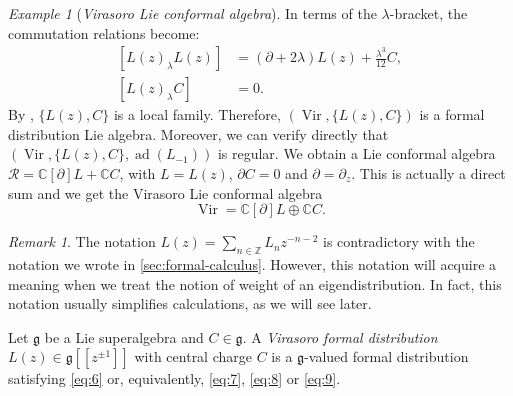 \documentclass[a4paper, 12pt, reqno]{amsart}
\theoremstyle{remark}
\newtheorem{remark}[theorem]{Remark}
\newtheorem{example}[theorem]{Example}
\numberwithin{equation}{subsection}
\DeclareMathOperator{\Vir}{Vir}
\DeclareMathOperator{\ad}{ad}
\begin{document}
\begin{example}[\emph{Virasoro Lie conformal algebra}]
  In terms of the $\lambda$-bracket, the commutation relations become:
  \begin{equation}
    \label{eq:9}
    \begin{split}
      [L(z)_{\lambda}L(z)] &= (\partial + 2\lambda)L(z) + \frac{\lambda^3}{12}C, \\
      [L(z)_{\lambda}C] &= 0.
    \end{split}
\end{equation}
  By , $\{L(z), C\}$ is a local family.
  Therefore, $(\Vir, \{L(z), C\})$ is a formal distribution Lie algebra.
  Moreover, we can verify directly that $(\Vir, \{L(z), C\}, \ad(L_{-1}))$ is regular.
  We obtain a Lie conformal algebra $\mathcal{R} = \mathbb{C}[\partial]L + \mathbb{C}C$, with $L = L(z)$, $\partial C = 0$ and $\partial = \partial_z$.
  This is actually a direct sum and we get the Virasoro Lie conformal algebra
  \begin{equation*}
    \Vir = \mathbb{C}[\partial]L \oplus \mathbb{C}C.
  \end{equation*}
\end{example}

\begin{remark}
  \label{rmk:8}
  The notation $L(z) = \sum_{n \in \mathbb{Z}}L_nz^{-n - 2}$ is contradictory with the notation we wrote in \cref{sec:formal-calculus}.
  However, this notation will acquire a meaning when we treat the notion of weight of an eigendistribution.
  In fact, this notation usually simplifies calculations, as we will see later.
\end{remark}

Let $\mathfrak{g}$ be a Lie superalgebra and $C \in \mathfrak{g}$.
A \emph{Virasoro formal distribution} $L(z) \in \mathfrak{g}[[z^{\pm 1}]]$ with central charge $C$ is a $\mathfrak{g}$-valued formal distribution satisfying \eqref{eq:6} or, equivalently, \eqref{eq:7}, \eqref{eq:8} or \eqref{eq:9}.
\end{document}
